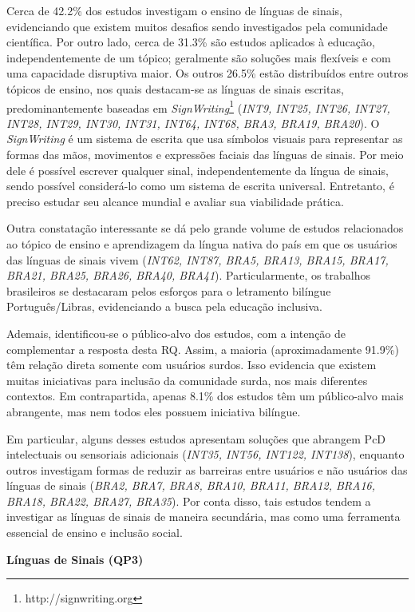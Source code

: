 Cerca de 42.2\% dos estudos investigam o ensino de línguas de sinais, evidenciando que existem muitos desafios sendo investigados pela comunidade científica. Por outro lado, cerca de 31.3\% são estudos aplicados à educação, independentemente de um tópico; geralmente são soluções mais flexíveis e com uma capacidade disruptiva maior. Os outros 26.5\% estão distribuídos entre outros tópicos de ensino, nos quais destacam-se as línguas de sinais escritas, predominantemente baseadas em \textit{SignWriting}\footnote{http://signwriting.org} (\textit{INT9, INT25, INT26, INT27, INT28, INT29, INT30, INT31, INT64, INT68, BRA3, BRA19, BRA20}). O \textit{SignWriting} é um sistema de escrita que usa símbolos visuais para representar as formas das mãos, movimentos e expressões faciais das línguas de sinais. Por meio dele é possível escrever qualquer sinal, independentemente da língua de sinais, sendo possível considerá-lo como um sistema de escrita universal. Entretanto, é preciso estudar seu alcance mundial e avaliar sua viabilidade prática.

Outra constatação interessante se dá pelo grande volume de estudos relacionados ao tópico de ensino e aprendizagem da língua nativa do país em que os usuários das línguas de sinais vivem (\textit{INT62, INT87, BRA5, BRA13, BRA15, BRA17, BRA21, BRA25, BRA26, BRA40, BRA41}). Particularmente, os trabalhos brasileiros se destacaram pelos esforços para o letramento bilíngue Português/Libras, evidenciando a busca pela educação inclusiva.

Ademais, identificou-se o público-alvo dos estudos, com a intenção de complementar a resposta desta RQ. Assim, a maioria (aproximadamente 91.9\%) têm relação direta somente com usuários surdos. Isso evidencia que existem muitas iniciativas para inclusão da comunidade surda, nos mais diferentes contextos. Em contrapartida, apenas 8.1\% dos estudos têm um público-alvo mais abrangente, mas nem todos eles possuem iniciativa bilíngue.

Em particular, alguns desses estudos apresentam soluções que abrangem PcD intelectuais ou sensoriais adicionais (\textit{INT35, INT56, INT122, INT138}), enquanto outros investigam formas de reduzir as barreiras entre usuários e não usuários das línguas de sinais (\textit{BRA2, BRA7, BRA8, BRA10, BRA11, BRA12, BRA16, BRA18, BRA22, BRA27, BRA35}). Por conta disso, tais estudos tendem a investigar as línguas de sinais de maneira secundária, mas como uma ferramenta essencial de ensino e inclusão social.

\noindent
\textbf{Línguas de Sinais (QP3)}

